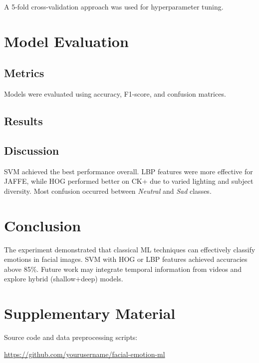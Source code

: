 \documentclass[12pt,a4paper]{article}
\begin{document}
A 5-fold cross-validation approach was used for hyperparameter tuning.

\section{Model Evaluation}
\subsection{Metrics}
Models were evaluated using accuracy, F1-score, and confusion matrices.

\subsection{Results}


\subsection{Discussion}
SVM achieved the best performance overall. 
LBP features were more effective for JAFFE, while HOG performed better on CK+ due to varied lighting and subject diversity. 
Most confusion occurred between \textit{Neutral} and \textit{Sad} classes.

\section{Conclusion}
The experiment demonstrated that classical ML techniques can effectively classify emotions in facial images. 
SVM with HOG or LBP features achieved accuracies above 85\%. 
Future work may integrate temporal information from videos and explore hybrid (shallow+deep) models.

\section*{Supplementary Material}
Source code and data preprocessing scripts:  

\url{https://github.com/yourusername/facial-emotion-ml}

	
\end{document}

